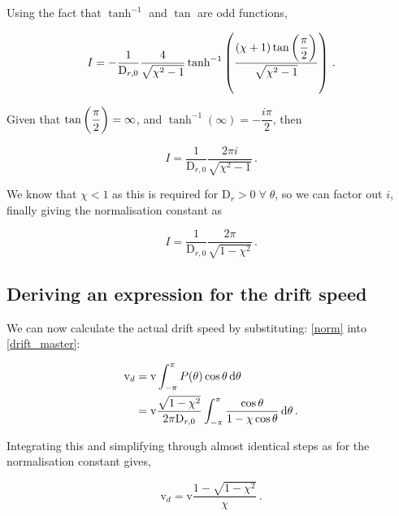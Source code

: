 \documentclass[a4wide,11pt]{article}
\begin{document}
Using the fact that $\tanh^{-1}$ and $\tan$ are odd functions,

\begin{equation}
    I = -\dfrac{1}{\mathrm{D}_{r,0}} \dfrac{4}{\sqrt{\chi^2 - 1}} \tanh^{-1} \del{ \dfrac{\del{\chi + 1} \tan \del{\dfrac{\pi}{2}}}{\sqrt{\chi^2 - 1}} } \,.
\end{equation}

Given that $\tan \del{\dfrac{\pi}{2}}=\infty$, and $\tanh^{-1}(\infty) = -\dfrac{i \pi}{2}$, then

\begin{equation}
    I = \dfrac{1}{\mathrm{D}_{r,0}} \dfrac{2 \pi i}{\sqrt{\chi^2 - 1}} \,.
\end{equation}

We know that $\chi < 1$ as this is required for $\mathrm{D}_r > 0 \; \forall \; \theta$, so we can factor out $i$, finally giving the normalisation constant as

\begin{equation}
    I = \dfrac{1}{\mathrm{D}_{r,0}} \dfrac{2 \pi}{\sqrt{1 - \chi^2}} \,.
    \label{norm}
\end{equation}

\subsection*{Deriving an expression for the drift speed}

We can now calculate the actual drift speed by substituting: \cref{norm} into \cref{drift_master}:

\begin{equation}
    \begin{aligned}
        \mathrm{v}_d &= \mathrm{v} \int_{-\pi}^{\pi} P(\theta) \cos \theta \dif \theta \\
                  &= \mathrm{v} \dfrac{\sqrt{1 - \chi^2}}{2 \pi \mathrm{D}_{r,0}} \int_{-\pi}^{\pi} \dfrac{\cos \theta}{1 - \chi \cos \theta} \dif \theta \,.
    \end{aligned}
\end{equation}

Integrating this and simplifying through almost identical steps as for the normalisation constant gives,

\begin{equation}
    \mathrm{v}_d = \mathrm{v} \dfrac{1 - \sqrt{1 - \chi^2}}{\chi} \,.
    \label{vd_s}
\end{equation}
\end{document}
